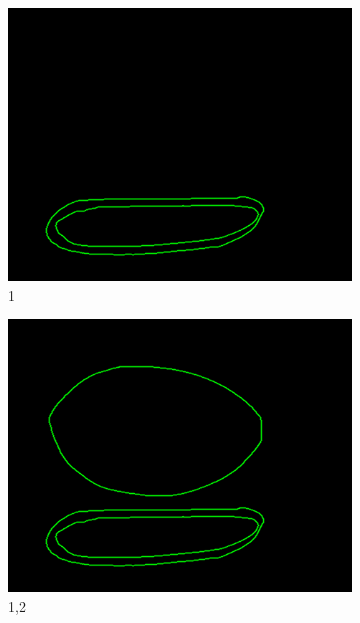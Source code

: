 \documentclass[11pt]{article}
\begin{document}
\begin{figure}[H]
	\centering
	\begin{subfigure}[t]{0.32\textwidth}
	\centering
		\includegraphics[scale=0.28]{pics/elimination/joinedAfterRemoval1.png}
		\caption{1}
		\label{construction1}
	\end{subfigure}
	\begin{subfigure}[t]{0.32\textwidth}
	\centering
		\includegraphics[scale=0.28]{pics/elimination/joinedAfterRemoval2.png}
		\caption{1,2}
		\label{construction2}
	\end{subfigure}
	\begin{subfigure}[t]{0.32\textwidth}
	\centering

\end{subfigure}
\end{figure}
\end{document}
